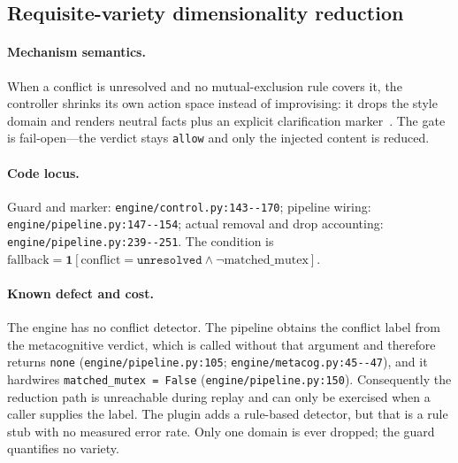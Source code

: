 \subsection{Requisite-variety dimensionality reduction}\label{sec:method:variety}

\paragraph{Mechanism semantics.} When a conflict is unresolved and no
mutual-exclusion rule covers it, the controller shrinks its own action space
instead of improvising: it drops the style domain and renders neutral facts plus
an explicit clarification marker~\cite{ashby1956}. The gate is fail-open---the
verdict stays \texttt{allow} and only the injected content is reduced.

\paragraph{Code locus.} Guard and marker: \texttt{engine/\allowbreak{}control.\allowbreak{}py:\allowbreak{}143-\allowbreak{}-\allowbreak{}170};
pipeline wiring: \texttt{engine/\allowbreak{}pipeline.\allowbreak{}py:\allowbreak{}147-\allowbreak{}-\allowbreak{}154}; actual removal and
drop accounting: \texttt{engine/\allowbreak{}pipeline.\allowbreak{}py:\allowbreak{}239-\allowbreak{}-\allowbreak{}251}. The condition is
$\mathrm{fallback} = \mathbf{1}[\mathrm{conflict} = \texttt{unresolved} \land
\neg \mathrm{matched\_mutex}]$.

\paragraph{Known defect and cost.} The engine has no conflict detector. The
pipeline obtains the conflict label from the metacognitive verdict, which is
called without that argument and therefore returns \texttt{none}
(\texttt{engine/\allowbreak{}pipeline.\allowbreak{}py:\allowbreak{}105}; \texttt{engine/\allowbreak{}metacog.\allowbreak{}py:\allowbreak{}45-\allowbreak{}-\allowbreak{}47}), and it
hardwires \texttt{matched\_\allowbreak{}mutex = False} (\texttt{engine/\allowbreak{}pipeline.\allowbreak{}py:\allowbreak{}150}).
Consequently the reduction path is unreachable during replay and can only be
exercised when a caller supplies the label. The plugin adds a rule-based
detector, but that is a rule stub with no measured error rate. Only one domain
is ever dropped; the guard quantifies no variety.

